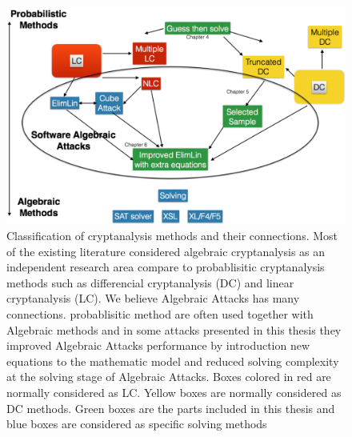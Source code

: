 \begin{figure}[h!]
	\centering
	\includegraphics[width=130mm]{./pics/ch3general.png}	
	\caption[Classification of cryptanalysis methods and their connections]{Classification of cryptanalysis methods and their connections. Most of the existing literature considered algebraic cryptanalysis as an independent research area compare to probablisitic cryptanalysis methods such as differencial cryptanalysis (DC) and linear cryptanalysis (LC). We believe Algebraic Attacks has many connections. probablisitic method are often used together with Algebraic methods and in some attacks presented in this thesis they improved Algebraic Attacks performance by introduction new equations to the mathematic model and reduced solving complexity at the solving stage of Algebraic Attacks. Boxes colored in red are normally considered as LC. Yellow boxes are normally considered as DC methods. Green boxes are the parts included in this thesis and blue boxes are considered as specific solving methods}
	\label{fig:ch3general}
\end{figure}	

